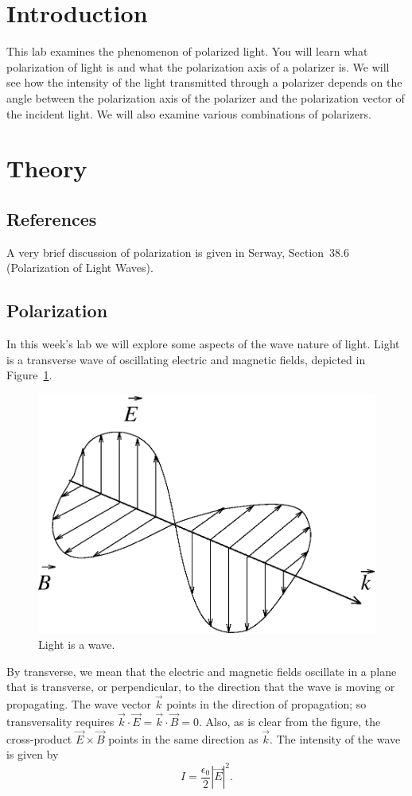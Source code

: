 \section{Introduction}

This lab examines the phenomenon of polarized light. You will learn what 
polarization of light is and what the polarization axis of a polarizer 
is. We will see how the intensity of the light transmitted through a polarizer 
depends on the angle between the polarization axis of the polarizer and the 
polarization vector of the incident light. We will also examine various 
combinations of polarizers.

\section{Theory}

\subsection{References}

A very brief discussion of polarization is given in Serway, Section~38.6 
(Polarization of Light Waves).

\subsection{Polarization}

In this week's lab we will explore some aspects of the wave nature of light.
Light is a transverse wave of oscillating electric and magnetic fields,
depicted in Figure~\ref{fig:pol:EMwave}.  
\begin{figure}
\centering 
\epsfxsize=7cm \includegraphics[scale=0.6]{7_polarization/EMwave.eps}
\caption{Light is a wave.}
\label{fig:pol:EMwave}
\end{figure}
By transverse, we mean that the electric and magnetic fields oscillate in a 
plane that is transverse, or perpendicular, to the direction that the wave is
moving or propagating. The wave vector $\vec{k}$ points in the direction of 
propagation; so transversality requires 
$\vec{k}\cdot\vec{E}=\vec{k}\cdot\vec{B}=0$. Also, as is clear from the figure,
the cross-product $\vec{E}\times\vec{B}$ points in the same direction as 
$\vec{k}$.  The intensity of the wave is given by 
$$ I = \frac{\epsilon_0}{2} |\vec{E}|^2. $$ 


